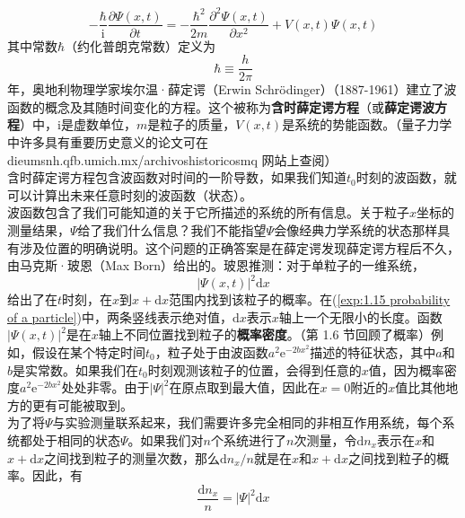 	\begin{equation}
		-\frac{\hbar}{\mathrm{i}}\frac{\partial \Psi \left(x,t\right)}{\partial t}= -\frac{\hbar^2}{2m}\frac{\partial^2 \Psi \left(x,t\right)}{\partial x^2}+ V\left(x,t\right)\Psi\left(x,t\right)
		\label{eq:1.13 Time-dependent Schödinger equation}
	\end{equation}
	其中常数$\hbar$（约化普朗克常数）定义为
	\begin{equation}
		\boxed{\hbar \equiv \frac{h}{2 \pi}}
		\label{eq:1.14 h-bar's definition}
	\end{equation}
	 年，奥地利物理学家埃尔温·薛定谔（Erwin Schrödinger）（1887-1961）建立了波函数的概念及其随时间变化的方程。这个被称为\textbf{含时薛定谔方程}（或\textbf{薛定谔波方程}）中，$\mathrm{i}$是虚数单位，$m$是粒子的质量，$V\left(x,t\right)$是系统的势能函数。（量子力学中许多具有重要历史意义的论文可在 dieumsnh.qfb.umich.mx/archivoshistoricosmq 网站上查阅）\\
	\indent 含时薛定谔方程包含波函数对时间的一阶导数，如果我们知道$t_0$时刻的波函数，就可以计算出未来任意时刻的波函数（状态）。\\
	\indent 波函数包含了我们可能知道的关于它所描述的系统的所有信息。关于粒子$x$坐标的测量结果，$\Psi$给了我们什么信息？我们不能指望$\Psi$会像经典力学系统的状态那样具有涉及位置的明确说明。这个问题的正确答案是在薛定谔发现薛定谔方程后不久，由马克斯·玻恩（Max Born）给出的。玻恩推测：对于单粒子的一维系统，
	\begin{equation}
		\left|\Psi \left(x,t\right)\right|^2 \mathrm{d}x
		\label{exp:1.15 probability of a particle}
	\end{equation}
	给出了在$t$时刻，在$x$到$x+ \mathrm{d}x$范围内找到该粒子的概率。在(\ref{exp:1.15 probability of a particle})中，两条竖线表示绝对值，$\mathrm{d}x$表示$x$轴上一个无限小的长度。函数$\left|\Psi \left(x,t\right)\right|^2$是在$x$轴上不同位置找到粒子的\textbf{概率密度}。（第 1.6 节回顾了概率）例如，假设在某个特定时间$t_0$，粒子处于由波函数$a^2\mathrm{e}^{-2bx^2}$描述的特征状态，其中$a$和$b$是实常数。如果我们在$t_0$时刻观测该粒子的位置，会得到任意的$x$值，因为概率密度$a^2\mathrm{e}^{-2bx^2}$处处非零。由于$\left|\Psi\right|^2$在原点取到最大值，因此在$x=0$附近的$x$值比其他地方的更有可能被取到。\\
	\indent 为了将$\Psi$与实验测量联系起来，我们需要许多完全相同的非相互作用系统，每个系统都处于相同的状态$\Psi$。如果我们对$n$个系统进行了$n$次测量，令$\mathrm{d}n_x$表示在$x$和$x+\mathrm{d}x$之间找到粒子的测量次数，那么$\mathrm{d}n_x/n$就是在$x$和$x+\mathrm{d}x$之间找到粒子的概率。因此，有
	\begin{equation*}
		\frac{\mathrm{d}n_x}{n} = \left|\Psi\right|^2\mathrm{d}x
	\end{equation*}
